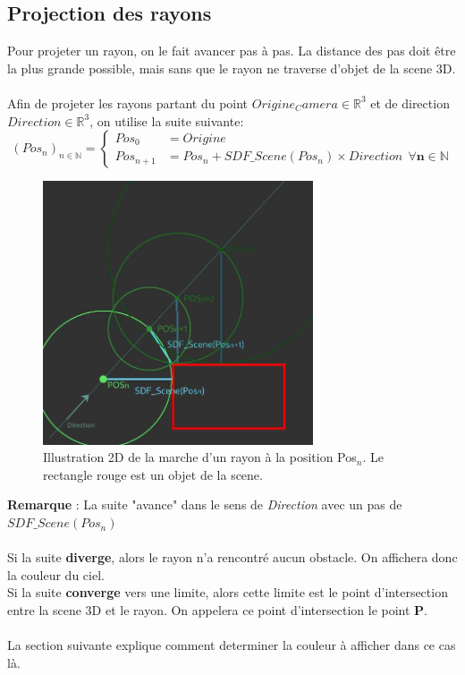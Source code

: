 \newpage
\subsection{Projection des rayons}
\label{subsec:projection}
Pour projeter un rayon, on le fait avancer pas à pas. La distance des pas doit être la plus grande possible, mais sans que le rayon ne traverse d'objet de la scene 3D.\\
\\
Afin de projeter les rayons partant du point $Origine_Camera\in \mathbb{R}^3$ et de direction $Direction\in \mathbb{R}^3$, on utilise la suite suivante:
$$
(Pos_n)_{n\in \mathbb{N}}=\left\{
    \begin{array}{ll}
        Pos_0 &= Origine \\
        Pos_{n+1} &= Pos_n + SDF\_Scene(Pos_n)\times Direction \ \ \mathbf{\forall n\in \mathbb{N}}
    \end{array}
\right.
$$

\begin{figure}[h]
    \centering
    \includegraphics[width=8cm]{images/ProjectionDesRayons.jpg}
    \caption{Illustration 2D de la marche d'un rayon à la position Pos$_n$. Le rectangle rouge est un objet de la scene.}
    \label{fig:projectionrayons}
\end{figure}

\textbf{Remarque} : La suite "avance" dans le sens de \emph{Direction} avec un pas de $SDF\_Scene(Pos_n)$\\
\\
Si la suite \textbf{diverge}, alors le rayon n'a rencontré aucun obstacle. On affichera donc la couleur du ciel.\\
Si la suite \textbf{converge} vers une limite, alors cette limite est le point d'intersection entre la scene 3D et le rayon. On appelera ce point d'intersection le point \textbf{P}.\\
\\
La section suivante explique comment determiner la couleur à afficher dans ce cas là.